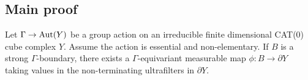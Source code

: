 \subsection{Main proof}
\label{sec:main-proof}

\begin{thm}[\cite{MR3509968}]
  Let \(\Gamma \to \operatorname{Aut}(Y)\) be a group action on an irreducible finite dimensional CAT(0) cube complex \(Y\). Assume the action is essential and non-elementary. If \(B\) is a strong \(\Gamma\)-boundary, there exists a \(\Gamma\)-equivariant measurable map \(\phi\colon B \to \partial Y\) taking values in the non-terminating ultrafilters in \(\partial Y\).
\end{thm}

